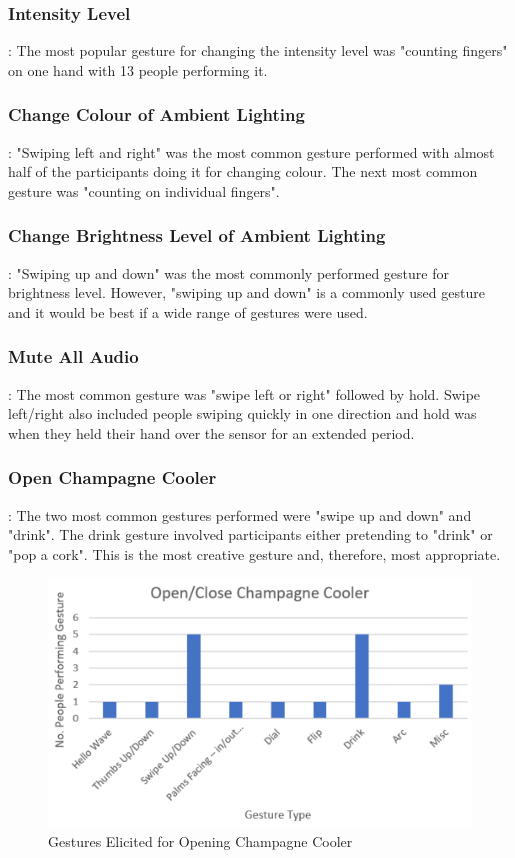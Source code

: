\documentclass{l4proj}
\begin{document}
\subsubsection{Intensity Level}: The most popular gesture for changing the intensity level was "counting fingers" on one hand with 13 people performing it. 
\subsubsection{Change Colour of Ambient Lighting}: "Swiping left and right" was the most common gesture performed with almost half of the participants doing it for changing colour. The next most common gesture was "counting on individual fingers". 
\subsubsection{Change Brightness Level of Ambient Lighting}: "Swiping up and down" was the most commonly performed gesture for brightness level. However, "swiping up and down" is a commonly used gesture and it would be best if a wide range of gestures were used.
\subsubsection{Mute All Audio}: The most common gesture was "swipe left or right" followed by hold. Swipe left/right also included people swiping quickly in one direction and hold was when they held their hand over the sensor for an extended period. 
\subsubsection{Open Champagne Cooler}: The two most common gestures performed were "swipe up and down" and "drink". The drink gesture involved participants either pretending to "drink" or "pop a cork". This is the most creative gesture and, therefore, most appropriate.
\begin{figure}[!htb]
    \centering
    \includegraphics[scale=0.8]{images/champagneCoolerGE.png}
    \caption{Gestures Elicited for Opening Champagne Cooler}
    \label{fig:champagneCoolerGE}
\end{figure}
\end{document}
